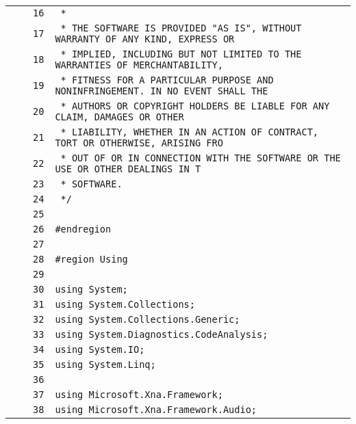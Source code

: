 \documentclass[a4paper,10pt]{article}
\begin{document}
\begin{longtable}[l]{lrrl}
\cellcolor{gray} &  & \verb~16~ & \verb~ *~\\
\cellcolor{gray} &  & \verb~17~ & \verb~ * THE SOFTWARE IS PROVIDED "AS IS", WITHOUT WARRANTY OF ANY KIND, EXPRESS OR~\\
\cellcolor{gray} &  & \verb~18~ & \verb~ * IMPLIED, INCLUDING BUT NOT LIMITED TO THE WARRANTIES OF MERCHANTABILITY,~\\
\cellcolor{gray} &  & \verb~19~ & \verb~ * FITNESS FOR A PARTICULAR PURPOSE AND NONINFRINGEMENT. IN NO EVENT SHALL THE~\\
\cellcolor{gray} &  & \verb~20~ & \verb~ * AUTHORS OR COPYRIGHT HOLDERS BE LIABLE FOR ANY CLAIM, DAMAGES OR OTHER~\\
\cellcolor{gray} &  & \verb~21~ & \verb~ * LIABILITY, WHETHER IN AN ACTION OF CONTRACT, TORT OR OTHERWISE, ARISING FRO~\\
\cellcolor{gray} &  & \verb~22~ & \verb~ * OUT OF OR IN CONNECTION WITH THE SOFTWARE OR THE USE OR OTHER DEALINGS IN T~\\
\cellcolor{gray} &  & \verb~23~ & \verb~ * SOFTWARE.~\\
\cellcolor{gray} &  & \verb~24~ & \verb~ */~\\
\cellcolor{gray} &  & \verb~25~ & \verb~~\\
\cellcolor{gray} &  & \verb~26~ & \verb~#endregion~\\
\cellcolor{gray} &  & \verb~27~ & \verb~~\\
\cellcolor{gray} &  & \verb~28~ & \verb~#region Using~\\
\cellcolor{gray} &  & \verb~29~ & \verb~~\\
\cellcolor{gray} &  & \verb~30~ & \verb~using System;~\\
\cellcolor{gray} &  & \verb~31~ & \verb~using System.Collections;~\\
\cellcolor{gray} &  & \verb~32~ & \verb~using System.Collections.Generic;~\\
\cellcolor{gray} &  & \verb~33~ & \verb~using System.Diagnostics.CodeAnalysis;~\\
\cellcolor{gray} &  & \verb~34~ & \verb~using System.IO;~\\
\cellcolor{gray} &  & \verb~35~ & \verb~using System.Linq;~\\
\cellcolor{gray} &  & \verb~36~ & \verb~~\\
\cellcolor{gray} &  & \verb~37~ & \verb~using Microsoft.Xna.Framework;~\\
\cellcolor{gray} &  & \verb~38~ & \verb~using Microsoft.Xna.Framework.Audio;~\\

\end{longtable}
\end{document}
